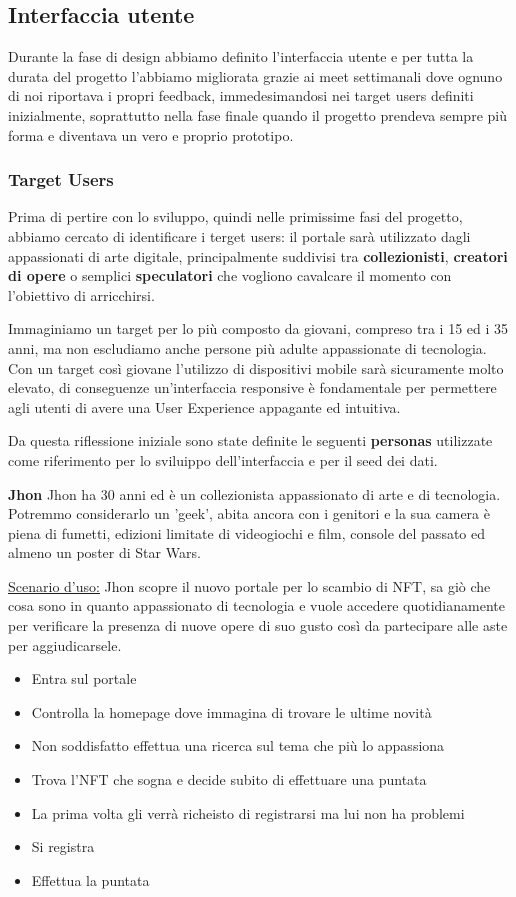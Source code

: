 \clearpage

\subsection{Interfaccia utente}
Durante la fase di design abbiamo definito l'interfaccia utente 
e per tutta la durata del progetto l'abbiamo migliorata grazie ai meet settimanali dove ognuno di noi riportava i propri feedback,
immedesimandosi nei target users definiti inizialmente,
soprattutto nella fase finale quando il progetto prendeva sempre più forma e diventava un vero e proprio prototipo.

\subsubsection{Target Users}
Prima di pertire con lo sviluppo, quindi nelle primissime fasi del progetto, abbiamo cercato di identificare i terget users:
il portale sarà utilizzato dagli appassionati di arte digitale, principalmente suddivisi tra \textbf{collezionisti}, \textbf{creatori di opere} 
o semplici \textbf{speculatori} che vogliono cavalcare il momento con l'obiettivo di arricchirsi.

Immaginiamo un target per lo più composto da giovani, compreso tra i 15 ed i 35 anni, ma non escludiamo anche persone più adulte appassionate di tecnologia.
Con un target così giovane l'utilizzo di dispositivi mobile sarà sicuramente molto elevato,
di conseguenze un'interfaccia responsive è fondamentale per permettere agli utenti di avere una User Experience appagante ed intuitiva. 

Da questa riflessione iniziale sono state definite le seguenti \textbf{personas} 
utilizzate come riferimento per lo sviluippo dell'interfaccia e per il seed dei dati.

\bigbreak
\noindent
\textbf{Jhon}
\bigbreak
\noindent
Jhon ha 30 anni ed è un collezionista appassionato di arte e di tecnologia. 
Potremmo considerarlo un 'geek', abita ancora con i genitori e la sua camera è piena di fumetti, 
edizioni limitate di videogiochi e film, console del passato ed almeno un poster di Star Wars.

\underline{Scenario d'uso:}
Jhon scopre il nuovo portale per lo scambio di NFT, 
sa giò che cosa sono in quanto appassionato di tecnologia 
e vuole accedere quotidianamente per verificare la presenza di nuove opere di suo gusto
così da partecipare alle aste per aggiudicarsele.

\begin{itemize}
	\item Entra sul portale
	\item Controlla la homepage dove immagina di trovare le ultime novità
	\item Non soddisfatto effettua una ricerca sul tema che più lo appassiona
	\item Trova l'NFT che sogna e decide subito di effettuare una puntata
	\item La prima volta gli verrà richeisto di registrarsi ma lui non ha problemi 
	\item Si registra 
	\item Effettua la puntata
\end{itemize}

